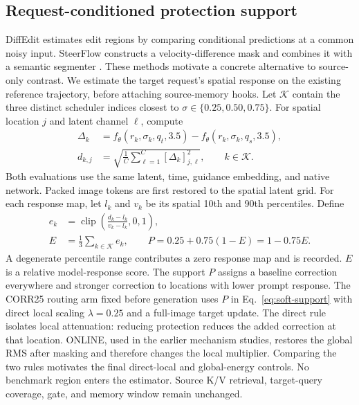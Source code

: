 \documentclass[conference]{IEEEtran}
\newcommand{\clip}{\operatorname{clip}}
\begin{document}
\subsection{Request-conditioned protection support}
\label{sec:extension}
DiffEdit estimates edit regions by comparing conditional predictions at a common noisy input. SteerFlow constructs a velocity-difference mask and combines it with a semantic segmenter \cite{couairon2023diffedit,dao2026steerflow}. These methods motivate a concrete alternative to source-only contrast. We estimate the target request's spatial response on the existing reference trajectory, before attaching source-memory hooks. Let $\mathcal K$ contain the three distinct scheduler indices closest to $\sigma\in\{0.25,0.50,0.75\}$. For spatial location $j$ and latent channel $\ell$, compute
\begin{equation}
\begin{aligned}
\Delta_k&=f_\theta(r_k,\sigma_k,q_t,3.5)-f_\theta(r_k,\sigma_k,q_s,3.5),\\
d_{k,j}&=\sqrt{\frac{1}{C}\sum_{\ell=1}^{C}[\Delta_k]_{j,\ell}^2},\qquad k\in\mathcal K.
\end{aligned}
\end{equation}
Both evaluations use the same latent, time, guidance embedding, and native network. Packed image tokens are first restored to the spatial latent grid. For each response map, let $l_k$ and $v_k$ be its spatial 10th and 90th percentiles. Define
\begin{equation}
\begin{aligned}
e_k&=\clip\!\left(\frac{d_k-l_k}{v_k-l_k},0,1\right),\\
E&=\frac{1}{3}\sum_{k\in\mathcal K}e_k,\qquad
P=0.25+0.75(1-E)=1-0.75E.
\end{aligned}
\label{eq:request-support}
\end{equation}
A degenerate percentile range contributes a zero response map and is recorded. $E$ is a relative model-response score. The support $P$ assigns a baseline correction everywhere and stronger correction to locations with lower prompt response. The CORR25 routing arm fixed before generation uses $P$ in Eq.~\eqref{eq:soft-support} with direct local scaling $\lambda=0.25$ and a full-image target update. The direct rule isolates local attenuation: reducing protection reduces the added correction at that location. ONLINE, used in the earlier mechanism studies, restores the global RMS after masking and therefore changes the local multiplier. Comparing the two rules motivates the final direct-local and global-energy controls. No benchmark region enters the estimator. Source K/V retrieval, target-query coverage, gate, and memory window remain unchanged.
\end{document}

